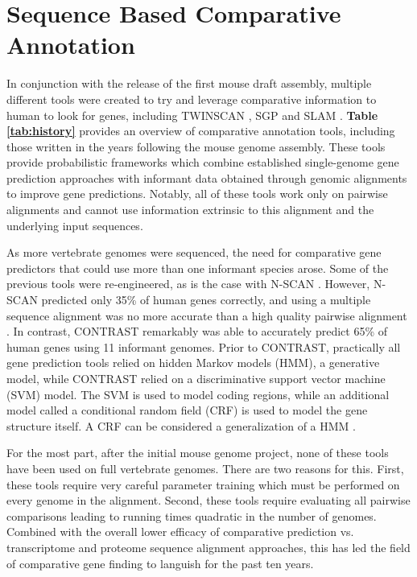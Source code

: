 \documentclass[fleqn,10pt]{wlscirep}
\begin{document}
\section{Sequence Based Comparative Annotation}

In conjunction with the release of the first mouse draft assembly\cite{waterston2002initial}, multiple different tools were created to try and leverage comparative information to human to look for genes, including TWINSCAN \cite{flicek2003leveraging}, SGP \cite{wiehe2001sgp} and SLAM \cite{alexandersson2003slam}. \textbf{Table \ref{tab:history}} provides an overview of comparative annotation tools, including those written in the years following the mouse genome assembly. These tools provide probabilistic frameworks which combine established single-genome gene prediction approaches \cite{yeh2001computational,gelfand1996gene} with informant data obtained through genomic alignments to improve gene predictions. Notably, all of these tools work only on pairwise alignments and cannot use information extrinsic to this alignment and the underlying input sequences.

As more vertebrate genomes were sequenced, the need for comparative gene predictors that could use more than one informant species arose. Some of the previous tools were re-engineered, as is the case with N-SCAN \cite{gross2006using,van2007using}. However, N-SCAN predicted only 35\% of human genes correctly, and using a multiple sequence alignment was no more accurate than a high quality pairwise alignment \cite{flicek2007gene}. In contrast, CONTRAST \cite{gross2007contrast} remarkably was able to accurately predict 65\% of human genes using 11 informant genomes. Prior to CONTRAST, practically all gene prediction tools relied on hidden Markov models (HMM), a generative model, while CONTRAST relied on a discriminative support vector machine (SVM) model. The SVM is used to model coding regions, while an additional model called a conditional random field (CRF) is used to model the gene structure itself. A CRF can be considered a generalization of a HMM \cite{lafferty2001conditional}.

For the most part, after the initial mouse genome project, none of these tools have been used on full vertebrate genomes. There are two reasons for this. First, these tools require very careful parameter training which must be performed on every genome in the alignment. Second, these tools require evaluating all pairwise comparisons leading to running times quadratic in the number of genomes. Combined with the overall lower efficacy of comparative prediction vs. transcriptome and proteome sequence alignment approaches, this has led the field of comparative gene finding to languish for the past ten years.
\end{document}
